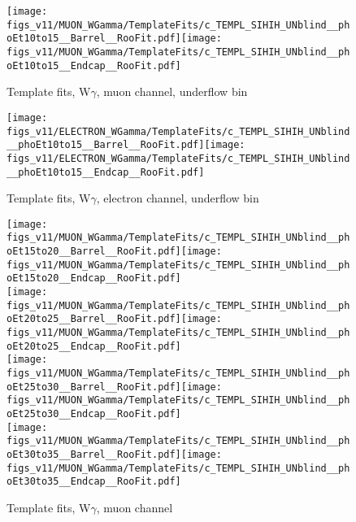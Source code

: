 \begin{figure}[htb]
  \begin{center}
   \texttt{[image: figs\_v11/MUON\_WGamma/TemplateFits/c\_TEMPL\_SIHIH\_UNblind\_\_phoEt10to15\_\_Barrel\_\_RooFit.pdf]}\texttt{[image: figs\_v11/MUON\_WGamma/TemplateFits/c\_TEMPL\_SIHIH\_UNblind\_\_phoEt10to15\_\_Endcap\_\_RooFit.pdf]}\\
  \label{fig:templateFits_SIHIH_MUON_0}
  \caption{Template fits, W$\gamma$, muon channel, underflow bin}
  \end{center}
\end{figure}

\begin{figure}[htb]
  \begin{center}
   \texttt{[image: figs\_v11/ELECTRON\_WGamma/TemplateFits/c\_TEMPL\_SIHIH\_UNblind\_\_phoEt10to15\_\_Barrel\_\_RooFit.pdf]}\texttt{[image: figs\_v11/ELECTRON\_WGamma/TemplateFits/c\_TEMPL\_SIHIH\_UNblind\_\_phoEt10to15\_\_Endcap\_\_RooFit.pdf]}\\
  \label{fig:templateFits_SIHIH_ELECTRON_0}
  \caption{Template fits, W$\gamma$, electron channel, underflow bin}
  \end{center}
\end{figure}

\begin{figure}[htb]
  \begin{center}
   \texttt{[image: figs\_v11/MUON\_WGamma/TemplateFits/c\_TEMPL\_SIHIH\_UNblind\_\_phoEt15to20\_\_Barrel\_\_RooFit.pdf]}\texttt{[image: figs\_v11/MUON\_WGamma/TemplateFits/c\_TEMPL\_SIHIH\_UNblind\_\_phoEt15to20\_\_Endcap\_\_RooFit.pdf]}\\
   \texttt{[image: figs\_v11/MUON\_WGamma/TemplateFits/c\_TEMPL\_SIHIH\_UNblind\_\_phoEt20to25\_\_Barrel\_\_RooFit.pdf]}\texttt{[image: figs\_v11/MUON\_WGamma/TemplateFits/c\_TEMPL\_SIHIH\_UNblind\_\_phoEt20to25\_\_Endcap\_\_RooFit.pdf]}\\
   \texttt{[image: figs\_v11/MUON\_WGamma/TemplateFits/c\_TEMPL\_SIHIH\_UNblind\_\_phoEt25to30\_\_Barrel\_\_RooFit.pdf]}\texttt{[image: figs\_v11/MUON\_WGamma/TemplateFits/c\_TEMPL\_SIHIH\_UNblind\_\_phoEt25to30\_\_Endcap\_\_RooFit.pdf]}\\
   \texttt{[image: figs\_v11/MUON\_WGamma/TemplateFits/c\_TEMPL\_SIHIH\_UNblind\_\_phoEt30to35\_\_Barrel\_\_RooFit.pdf]}\texttt{[image: figs\_v11/MUON\_WGamma/TemplateFits/c\_TEMPL\_SIHIH\_UNblind\_\_phoEt30to35\_\_Endcap\_\_RooFit.pdf]}\\
  \label{fig:templateFits_SIHIH_MUON_1}
  \caption{Template fits, W$\gamma$, muon channel}
  \end{center}
\end{figure}

